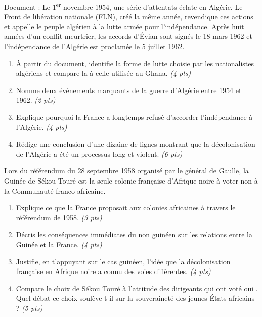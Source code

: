 \documentclass[11pt]{article}
\begin{document}
\begin{exercice}
Document : \og Le 1\textsuperscript{er} novembre 1954, une série d'attentats éclate en Algérie. Le Front de libération nationale (FLN), créé la même année, revendique ces actions et appelle le peuple algérien à la lutte armée pour l'indépendance. Après huit années d'un conflit meurtrier, les accords d'Évian sont signés le 18 mars 1962 et l'indépendance de l'Algérie est proclamée le 5 juillet 1962. \fg
\begin{enumerate}
\item À partir du document, identifie la forme de lutte choisie par les nationalistes algériens et compare-la à celle utilisée au Ghana. \textit{(4 pts)}
\item Nomme deux événements marquants de la guerre d'Algérie entre 1954 et 1962. \textit{(2 pts)}
\item Explique pourquoi la France a longtemps refusé d'accorder l'indépendance à l'Algérie. \textit{(4 pts)}
\item Rédige une conclusion d'une dizaine de lignes montrant que la décolonisation de l'Algérie a été un processus long et violent. \textit{(6 pts)}
\end{enumerate}
\end{exercice}

\begin{exercice}
Lors du référendum du 28 septembre 1958 organisé par le général de Gaulle, la Guinée de Sékou Touré est la seule colonie française d'Afrique noire à voter \og non \fg{} à la Communauté franco-africaine.
\begin{enumerate}
\item Explique ce que la France proposait aux colonies africaines à travers le référendum de 1958. \textit{(3 pts)}
\item Décris les conséquences immédiates du \og non \fg{} guinéen sur les relations entre la Guinée et la France. \textit{(4 pts)}
\item Justifie, en t'appuyant sur le cas guinéen, l'idée que la décolonisation française en Afrique noire a connu des voies différentes. \textit{(4 pts)}
\item Compare le choix de Sékou Touré à l'attitude des dirigeants qui ont voté \og oui \fg. Quel débat ce choix soulève-t-il sur la souveraineté des jeunes États africains ? \textit{(5 pts)}
\end{enumerate}
\end{exercice}
\end{document}
